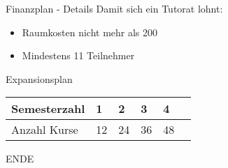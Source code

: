 \begin{frame}[c]{Finanzplan - Details}
    \Large
    Damit sich ein Tutorat lohnt:
    \begin{itemize}[<+(1)->]
    \item Raumkosten nicht mehr als 200
        \newline
    \item Mindestens 11 Teilnehmer
    \end{itemize}
\end{frame}


\begin{frame}[c]{Expansionsplan}
    \begin{tabular}{|l|l|l|l|l|l|}
        \hline
        Semesterzahl & 1  & 2  & 3  & 4 \\
        \hline
        Anzahl Kurse & 12 & 24 & 36 & 48 \\
        \hline
    \end{tabular}
\end{frame}


\begin{frame}[standout]
    ENDE
\end{frame}
